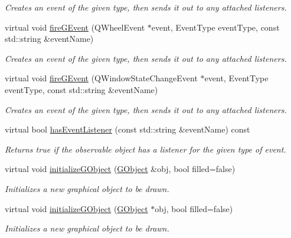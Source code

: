 \begin{DoxyCompactItemize}
\begin{DoxyCompactList}\small\item\em Creates an event of the given type, then sends it out to any attached listeners. \end{DoxyCompactList}\item 
virtual void \mbox{\hyperlink{classGObservable_a93bf338968a0338761b8e4dc62f582e9}{fire\+G\+Event}} (Q\+Wheel\+Event $\ast$event, Event\+Type event\+Type, const std\+::string \&event\+Name)
\begin{DoxyCompactList}\small\item\em Creates an event of the given type, then sends it out to any attached listeners. \end{DoxyCompactList}\item 
virtual void \mbox{\hyperlink{classGObservable_a2a70a7d7435ff0c3b80bb4d70da19e0d}{fire\+G\+Event}} (Q\+Window\+State\+Change\+Event $\ast$event, Event\+Type event\+Type, const std\+::string \&event\+Name)
\begin{DoxyCompactList}\small\item\em Creates an event of the given type, then sends it out to any attached listeners. \end{DoxyCompactList}\item 
virtual bool \mbox{\hyperlink{classGObservable_a9f6faaa25942923bafa1c44020c49fa9}{has\+Event\+Listener}} (const std\+::string \&event\+Name) const
\begin{DoxyCompactList}\small\item\em Returns true if the observable object has a listener for the given type of event. \end{DoxyCompactList}\item 
virtual void \mbox{\hyperlink{classGDrawingSurface_a814498efebc5586645159cd22990cf61}{initialize\+G\+Object}} (\mbox{\hyperlink{classGObject}{G\+Object}} \&obj, bool filled=false)
\begin{DoxyCompactList}\small\item\em Initializes a new graphical object to be drawn. \end{DoxyCompactList}\item 
virtual void \mbox{\hyperlink{classGDrawingSurface_a43e6bc951980da061ddc40407daee227}{initialize\+G\+Object}} (\mbox{\hyperlink{classGObject}{G\+Object}} $\ast$obj, bool filled=false)
\begin{DoxyCompactList}\small\item\em Initializes a new graphical object to be drawn. \end{DoxyCompactList}\item 

\end{DoxyCompactItemize}
